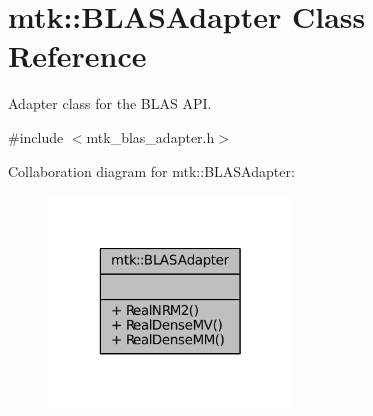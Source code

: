 \hypertarget{classmtk_1_1BLASAdapter}{\section{mtk\-:\-:B\-L\-A\-S\-Adapter Class Reference}
\label{classmtk_1_1BLASAdapter}
}


Adapter class for the B\-L\-A\-S A\-P\-I.  




{\ttfamily \#include $<$mtk\-\_\-blas\-\_\-adapter.\-h$>$}



Collaboration diagram for mtk\-:\-:B\-L\-A\-S\-Adapter\-:
\nopagebreak
\begin{figure}[H]
\begin{center}
\leavevmode
\includegraphics[width=184pt]{classmtk_1_1BLASAdapter__coll__graph}
\end{center}
\end{figure}
